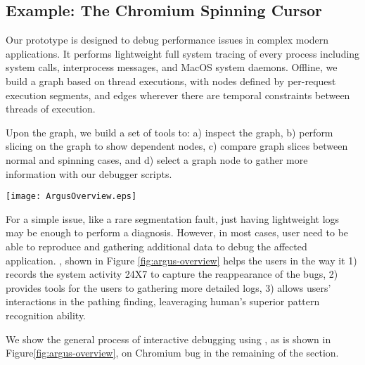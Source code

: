 \subsection{Example: The Chromium Spinning Cursor}


Our \xxx prototype is designed to debug performance issues in complex modern applications.
It performs lightweight full system tracing of every process including system calls,
interprocess messages, and MacOS system daemons.
Offline, we build a graph based on thread executions, with nodes defined by
per-request execution segments,
and edges wherever there are temporal constraints between threads of execution.

Upon the graph, we build a set of tools to:
a) inspect the graph,
b) perform slicing on the graph to show dependent nodes,
c) compare graph slices between normal and spinning cases, and
d) select a graph node to gather more information with our debugger scripts.

\begin{figure*}[tb]
    \centering
    \texttt{[image: ArgusOverview.eps]}
    \caption{Design Overview}
    \label{fig:argus-overview}
\end{figure*}

For a simple issue, like a rare segmentation fault,
just having lightweight logs may be enough to perform a diagnosis.
However, in most cases, user need to be able to reproduce and gathering
additional data to debug the affected application.
\xxx, shown in Figure \ref{fig:argus-overview} helps the users in the way
it 1) records the system activity 24X7 to capture the reappearance of the bugs,
2) provides tools for the users to gathering more detailed logs,
3) allows users' interactions in the pathing finding,
leaveraging human's superior pattern recognition ability.

We show the general process of interactive debugging using \xxx,
as is shown in Figure\ref{fig:argus-overview},
on Chromium bug in the remaining of the section.

